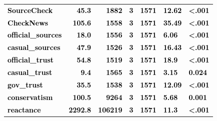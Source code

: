 \documentclass[]{article}
\begin{document}
\begin{table}[H]
\begin{tabular}[t]{lrrrrll}
\textcolor{black}{\textbf{SourceCheck}} & \textcolor{black}{\textbf{45.3}} & \textcolor{black}{\textbf{1882}} & \textcolor{black}{\textbf{3}} & \textcolor{black}{\textbf{1571}} & \textcolor{black}{\textbf{12.62}} & \textcolor{black}{\textbf{<.001}}\\
\textcolor{black}{\textbf{CheckNews}} & \textcolor{black}{\textbf{105.6}} & \textcolor{black}{\textbf{1558}} & \textcolor{black}{\textbf{3}} & \textcolor{black}{\textbf{1571}} & \textcolor{black}{\textbf{35.49}} & \textcolor{black}{\textbf{<.001}}\\
\addlinespace
\textcolor{black}{\textbf{official\_sources}} & \textcolor{black}{\textbf{18.0}} & \textcolor{black}{\textbf{1556}} & \textcolor{black}{\textbf{3}} & \textcolor{black}{\textbf{1571}} & \textcolor{black}{\textbf{6.06}} & \textcolor{black}{\textbf{<.001}}\\
\textcolor{black}{\textbf{casual\_sources}} & \textcolor{black}{\textbf{47.9}} & \textcolor{black}{\textbf{1526}} & \textcolor{black}{\textbf{3}} & \textcolor{black}{\textbf{1571}} & \textcolor{black}{\textbf{16.43}} & \textcolor{black}{\textbf{<.001}}\\
\textcolor{black}{\textbf{official\_trust}} & \textcolor{black}{\textbf{54.8}} & \textcolor{black}{\textbf{1519}} & \textcolor{black}{\textbf{3}} & \textcolor{black}{\textbf{1571}} & \textcolor{black}{\textbf{18.9}} & \textcolor{black}{\textbf{<.001}}\\
\textcolor{black}{\textbf{casual\_trust}} & \textcolor{black}{\textbf{9.4}} & \textcolor{black}{\textbf{1565}} & \textcolor{black}{\textbf{3}} & \textcolor{black}{\textbf{1571}} & \textcolor{black}{\textbf{3.15}} & \textcolor{black}{\textbf{0.024}}\\
\textcolor{black}{\textbf{gov\_trust}} & \textcolor{black}{\textbf{35.5}} & \textcolor{black}{\textbf{1538}} & \textcolor{black}{\textbf{3}} & \textcolor{black}{\textbf{1571}} & \textcolor{black}{\textbf{12.09}} & \textcolor{black}{\textbf{<.001}}\\
\addlinespace
\textcolor{black}{\textbf{conservatism}} & \textcolor{black}{\textbf{100.5}} & \textcolor{black}{\textbf{9264}} & \textcolor{black}{\textbf{3}} & \textcolor{black}{\textbf{1571}} & \textcolor{black}{\textbf{5.68}} & \textcolor{black}{\textbf{0.001}}\\
\textcolor{black}{\textbf{reactance}} & \textcolor{black}{\textbf{2292.8}} & \textcolor{black}{\textbf{106219}} & \textcolor{black}{\textbf{3}} & \textcolor{black}{\textbf{1571}} & \textcolor{black}{\textbf{11.3}} & \textcolor{black}{\textbf{<.001}}\\

\end{tabular}
\end{table}
\end{document}
